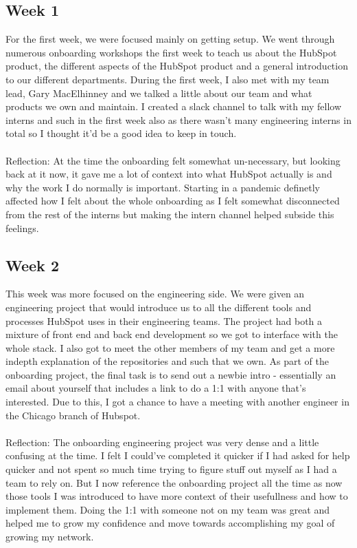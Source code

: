 \documentclass[11pt]{article} %
\begin{document}
\subsection{Week 1}
For the first week, we were focused mainly on getting setup. We went through numerous onboarding workshops the first week to teach us about the HubSpot product, the different aspects of the HubSpot product and a general introduction to our different departments. During the first week, I also met with my team lead, Gary MacElhinney and we talked a little about our team and what products we own and maintain. I created a slack channel to talk with my fellow interns and such in the first week also as there wasn't many engineering interns in total so I thought it'd be a good idea to keep in touch. 
\\\\ 
Reflection: At the time the onboarding felt somewhat un-necessary, but looking back at it now, it gave me a lot of context into what HubSpot actually is and why the work I do normally is important. Starting in a pandemic definetly affected how I felt about the whole onboarding as I felt somewhat disconnected from the rest of the interns but making the intern channel helped subside this feelings. 
\subsection{Week 2}
This week was more focused on the engineering side. We were given an engineering project that would introduce us to all the different tools and processes HubSpot uses in their engineering teams. The project had both a mixture of front end and back end development so we got to interface with the whole stack. I also got to meet the other members of my team and get a more indepth explanation of the repositories and such that we own. As part of the onboarding project, the final task is to send out a newbie intro - essentially an email about yourself that includes a link to do a 1:1 with anyone that's interested. Due to this, I got a chance to have a meeting with another engineer in the Chicago branch of Hubspot. 
\\\\
Reflection: The onboarding engineering project was very dense and a little confusing at the time. I felt I could've completed it quicker if I had asked for help quicker and not spent so much time trying to figure stuff out myself as I had a team to rely on. But I now reference the onboarding project all the time as now those tools I was introduced to have more context of their usefullness and how to implement them. Doing the 1:1 with someone not on my team was great and helped me to grow my confidence and move towards accomplishing my goal of growing my network.
\end{document}
